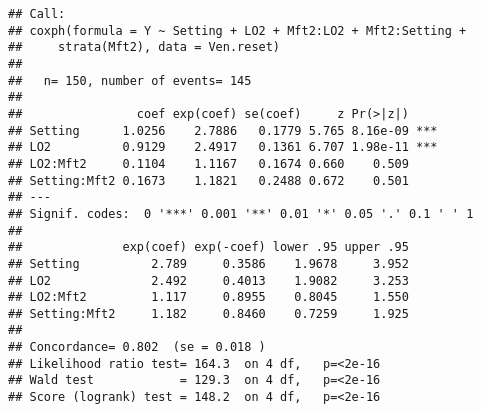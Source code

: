 \documentclass[
]{article}
\newenvironment{Shaded}{\begin{snugshade}}{\end{snugshade}}
\newcommand{\AttributeTok}[1]{\textcolor[rgb]{0.77,0.63,0.00}{#1}}
\newcommand{\CommentTok}[1]{\textcolor[rgb]{0.56,0.35,0.01}{\textit{#1}}}
\newcommand{\DecValTok}[1]{\textcolor[rgb]{0.00,0.00,0.81}{#1}}
\newcommand{\FunctionTok}[1]{\textcolor[rgb]{0.00,0.00,0.00}{#1}}
\newcommand{\NormalTok}[1]{#1}
\newcommand{\OtherTok}[1]{\textcolor[rgb]{0.56,0.35,0.01}{#1}}
\newcommand{\SpecialCharTok}[1]{\textcolor[rgb]{0.00,0.00,0.00}{#1}}
\begin{document}
\begin{Shaded}
\end{Shaded}

\begin{verbatim}
## Call:
## coxph(formula = Y ~ Setting + LO2 + Mft2:LO2 + Mft2:Setting + 
##     strata(Mft2), data = Ven.reset)
## 
##   n= 150, number of events= 145 
## 
##                coef exp(coef) se(coef)     z Pr(>|z|)    
## Setting      1.0256    2.7886   0.1779 5.765 8.16e-09 ***
## LO2          0.9129    2.4917   0.1361 6.707 1.98e-11 ***
## LO2:Mft2     0.1104    1.1167   0.1674 0.660    0.509    
## Setting:Mft2 0.1673    1.1821   0.2488 0.672    0.501    
## ---
## Signif. codes:  0 '***' 0.001 '**' 0.01 '*' 0.05 '.' 0.1 ' ' 1
## 
##              exp(coef) exp(-coef) lower .95 upper .95
## Setting          2.789     0.3586    1.9678     3.952
## LO2              2.492     0.4013    1.9082     3.253
## LO2:Mft2         1.117     0.8955    0.8045     1.550
## Setting:Mft2     1.182     0.8460    0.7259     1.925
## 
## Concordance= 0.802  (se = 0.018 )
## Likelihood ratio test= 164.3  on 4 df,   p=<2e-16
## Wald test            = 129.3  on 4 df,   p=<2e-16
## Score (logrank) test = 148.2  on 4 df,   p=<2e-16
\end{verbatim}

\begin{Shaded}
\end{Shaded}
\end{document}
